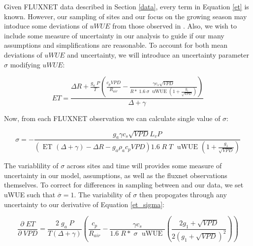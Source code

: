 \documentclass[draft,linenumbers]{agujournal}
\begin{document}
Given FLUXNET data described in Section \ref{data}, every term in Equation \ref{et} is known. However, our sampling of sites and our focus on the growing season may intoduce some deviations of $uWUE$ from those observed in \citet{Zhou_2015}. Also, we wish to include some measure of uncertainty in our analysis to guide if our many assumptions and simplifications are reasonable. To account for both mean deviations of $uWUE$ and uncertainty, we will introduce an uncertainty parameter $\sigma$ modifying $uWUE$:

\begin{linenomath*}
  \begin{equation}
    ET = \frac{\Delta R + \frac{g_a\; P}{T} \left( \frac{ c_p VPD}{R_{air}} -  \frac{\gamma c_s \sqrt{VPD} }{ R* \; 1.6\; \sigma \; \text{ uWUE } (1 + \frac{g_1}{\sqrt{VPD}})} \right) }{ \Delta + \gamma}
    \label{et_sigma}
  \end{equation}
\end{linenomath*}

Now, from each FLUXNET observation we can calculate single value of $\sigma$:

\begin{linenomath*}
  \begin{equation}
\sigma = - \frac{g_a \gamma c_s \sqrt{VPD} L_v P }{ \left(\text{ ET } ( \Delta + \gamma) - \Delta R - g_a \rho_a c_p VPD\right) 1.6 \; R\; T\; \text{ uWUE } (1 + \frac{g_1}{\sqrt{VPD}})}
    \label{et_sigma}
  \end{equation}
\end{linenomath*}

The variablility of $\sigma$ across sites and time will provides some measure of uncertainty in our model, assumptions, as well as the fluxnet observations themselves. To correct for differences in sampling between \cite{Zhou_2015} and our data, we set uWUE such that $\overline{\sigma} = 1$. The variability of $\sigma$ then propogates through any uncertainty to our derivative of Equation \ref{et_sigma}:

\begin{linenomath*}
  \begin{equation}
    \frac{\partial \;  ET}{\partial \; VPD} = \frac{2\; g_a \; P}{T(\Delta + \gamma)}   \left(\frac{ c_p}{R_{air}} -  \frac{\gamma c_s }{1.6 \; R*\; \sigma \; \text{ uWUE }} \left( \frac{2 g_1 + \sqrt{VPD}}{2 (g_1 + \sqrt{VPD})^2}\right) \right)
    \label{d_et}
  \end{equation}
\end{linenomath*}
\end{document}
